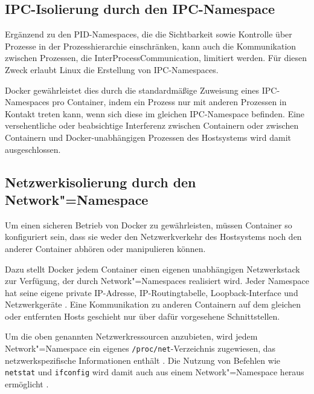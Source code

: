 \documentclass[../main.tex]{subfiles}
\begin{document}
    \subsection{\acrshort{IPC}-Isolierung durch den \acrshort{IPC}-Namespace}
			Ergänzend zu den PID-Namespaces, die die Sichtbarkeit sowie Kontrolle über Prozesse in der Prozesshierarchie einschränken, kann auch die Kommunikation zwischen Prozessen, die \gls{InterProcessCommunication}, limitiert werden. Für diesen Zweck erlaubt Linux die Erstellung von IPC-Namespaces.




			Docker gewährleistet dies durch die standardmäßige Zuweisung eines IPC-Namespaces pro Container, indem ein Prozess nur mit anderen Prozessen in Kontakt treten kann, wenn sich diese im gleichen IPC-Namespace befinden. Eine versehentliche oder beabsichtige Interferenz zwischen Containern oder zwischen Containern und Docker-unabhängigen Prozessen des Hostsystems wird damit ausgeschlossen.



    \subsection{Netzwerkisolierung durch den Network"=Namespace}
			Um einen sicheren Betrieb von Docker zu gewährleisten, müssen Container so konfiguriert sein, dass sie weder den Netzwerkverkehr des Hostsystems noch den anderer Container abhören oder manipulieren können.

			Dazu stellt Docker jedem Container einen eigenen unabhängigen Netzwerkstack zur Verfügung, der durch Network"=Namespaces realisiert wird. Jeder Namespace hat seine eigene private \acrshort{IP}-Adresse, IP-Routingtabelle, Loopback-Interface und Netzwerkgeräte \cite[S.2f.]{virtVSContainer}. Eine Kommunikation zu anderen Containern auf dem gleichen oder entfernten Hosts geschieht nur über dafür vorgesehene Schnittstellen.

			Um die oben genannten Netzwerkressourcen anzubieten, wird jedem Network"=Namespace ein eigenes \texttt{/proc/net}-Verzeichnis zugewiesen, das netzwerkspezifische Informationen enthält \cite{proc}. Die Nutzung von Befehlen wie \texttt{netstat} und \texttt{ifconfig} wird damit auch aus einem Network"=Namespace heraus ermöglicht \cite[S.7]{IBMcheckpointRestart}.
\end{document}
